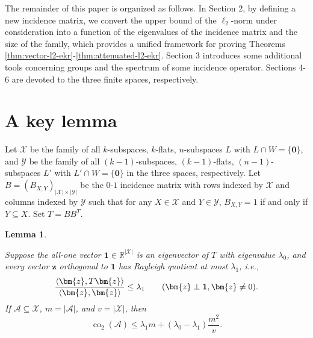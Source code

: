 \documentclass[11pt]{article}
\newtheorem{lemma}{Lemma}
\theoremstyle{definition}
\newcommand{\co}{\operatorname{co}_2}
\begin{document}
The remainder of this paper is organized as follows. In Section 2, by defining a new incidence matrix, we convert the upper bound of the $\ell_2$-norm under consideration into a function of the eigenvalues of the incidence matrix and the size of the family, which provides a unified framework for proving Theorems \ref{thm:vector-l2-ekr}-\ref{thm:attenuated-l2-ekr}. 
Section 3 introduces some additional tools concerning groups and the spectrum of some incidence operator. Sections 4-6 are devoted to the three finite spaces, respectively.

\section{A key lemma}

Let $\mathscr{X}$ be the family of all $k$-subspaces, $k$-flats, $n$-subspaces $L$ with $L\cap W=\{\bm{0}\}$, and $\mathscr{Y}$ be the family of all $(k-1)$-subspaces, $(k-1)$-flats, $(n-1)$-subspaces $L'$ with $L'\cap W=\{\bm{0}\}$ in the three spaces, respectively. Let $B=(B_{X,Y})_{|\mathscr{X}|\times |\mathscr{Y}|}$ be the $0$-$1$ incidence matrix with rows indexed by $\mathscr{X}$ and columns indexed by $\mathscr{Y}$ such that for any $X\in \mathscr{X}$ and $Y\in \mathscr{Y}$,  $B_{X,Y}=1$ if and only if $Y\subseteq X$. Set $T=BB^T$.

\begin{lemma}\label{lem:general-spectral}

Suppose the all-one vector $\mathbf 1\in\mathbb R^{|\mathscr{X}|}$ is an eigenvector of $T$ with eigenvalue $\lambda_0$, and every vector $\bm{z}$ orthogonal to $\mathbf 1$ has Rayleigh quotient at most $\lambda_1$, i.e.,
\[
\frac{\langle \bm{z},T\bm{z}\rangle}{\langle \bm{z},\bm{z}\rangle}\le \lambda_1
\qquad(\bm{z}\perp \mathbf 1,\\ \bm{z}\ne 0).
\]
If $\mathcal A\subseteq \mathscr{X}$, $m=|\mathcal A|$, and $v=|\mathscr{X}|$, then
\[
\co(\mathcal A)\le \lambda_1m+(\lambda_0-\lambda_1)\frac{m^2}{v}.
\]
\end{lemma}
\end{document}

